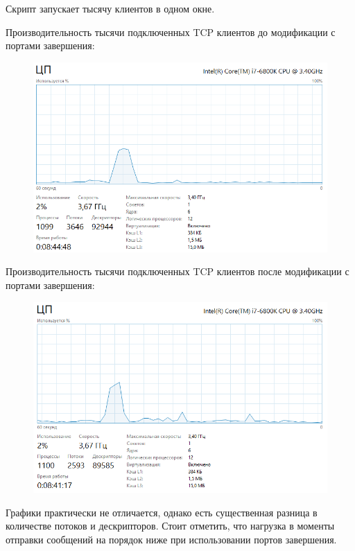 \documentclass[14pt,a4paper,report]{report}
\begin{document}
Скрипт запускает тысячу клиентов в одном окне.

Производительность тысячи подключенных TCP клиентов до модификации с портами завершения:

\begin{figure}[h!]
	\centering
	\includegraphics[scale = 0.75]{images/p3_5_old_stat.png}
	
	\caption{}
	\label{image:18}
\end{figure}

Производительность тысячи подключенных TCP клиентов после модификации с портами завершения:

\begin{figure}[h!]
	\centering
	\includegraphics[scale = 0.75]{images/p3_5_new_stat.png}
	
	\caption{}
	\label{image:19}
\end{figure}

Графики практически не отличается, однако есть существенная разница в количестве потоков и дескрипторов. Стоит отметить, что нагрузка в моменты отправки сообщений на порядок ниже при использовании портов завершения.
\end{document}
